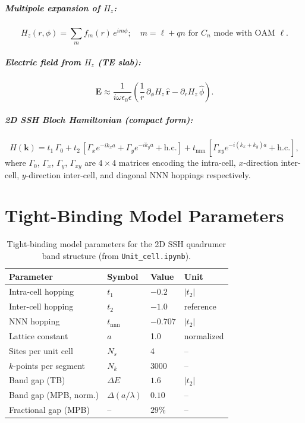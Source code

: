 \documentclass[12pt,a4paper,oneside]{book}
\theoremstyle{plain}
\theoremstyle{definition}
\theoremstyle{remark}
\newcommand{\vb}[1]{\bm{#1}}
\newcommand{\uv}[1]{\hat{\bm{#1}}}
\newcommand{\Efield}{\vb{E}}
\newcommand{\eps}{\epsilon}
\newcommand{\om}{\omega}
\newcommand{\kvec}{\vb{k}}
\begin{document}
\paragraph{Multipole expansion of $H_z$:}
\begin{equation}
  H_z(r,\phi) = \sum_m f_m(r)\,e^{im\phi}; \quad m = \ell + qn \text{ for } C_n \text{ mode with OAM } \ell.
\end{equation}

\paragraph{Electric field from $H_z$ (TE slab):}
\begin{equation}
  \Efield \approx \frac{1}{i\om\eps_0\eps}\!\left(\frac{1}{r}\,\partial_\phi H_z\,\uv{r} - \partial_r H_z\,\hat{\phi}\right).
\end{equation}

\paragraph{2D SSH Bloch Hamiltonian (compact form):}
\begin{equation}
  H(\kvec) = t_1\,\Gamma_0 + t_2\,[\Gamma_x e^{-ik_xa} + \Gamma_y e^{-ik_ya} + \mathrm{h.c.}]
              + t_\mathrm{nnn}\,[\Gamma_{xy}e^{-i(k_x+k_y)a} + \mathrm{h.c.}],
\end{equation}
where $\Gamma_0$, $\Gamma_x$, $\Gamma_y$, $\Gamma_{xy}$ are $4\times4$ matrices encoding the intra-cell, $x$-direction inter-cell, $y$-direction inter-cell, and diagonal NNN hoppings respectively.

\chapter{Tight-Binding Model Parameters}
\label{app:tb-params}

\begin{table}[htbp]
  \centering
  \caption{Tight-binding model parameters for the 2D SSH quadrumer band structure (from \texttt{Unit\_cell.ipynb}).}
  \label{tab:tb-full}
  \begin{tabular}{llll}
    \toprule
    Parameter & Symbol & Value & Unit \\
    \midrule
    Intra-cell hopping & $t_1$ & $-0.2$ & $|t_2|$ \\
    Inter-cell hopping & $t_2$ & $-1.0$ & reference \\
    NNN hopping & $t_\mathrm{nnn}$ & $-0.707$ & $|t_2|$ \\
    Lattice constant & $a$ & 1.0 & normalized \\
    Sites per unit cell & $N_s$ & 4 & -- \\
    $k$-points per segment & $N_k$ & 3000 & -- \\
    Band gap (TB) & $\Delta E$ & $1.6$ & $|t_2|$ \\
    Band gap (MPB, norm.) & $\Delta(a/\lambda)$ & $0.10$ & -- \\
    Fractional gap (MPB) & -- & $29\%$ & -- \\
    \bottomrule
  \end{tabular}
\end{table}
\end{document}
